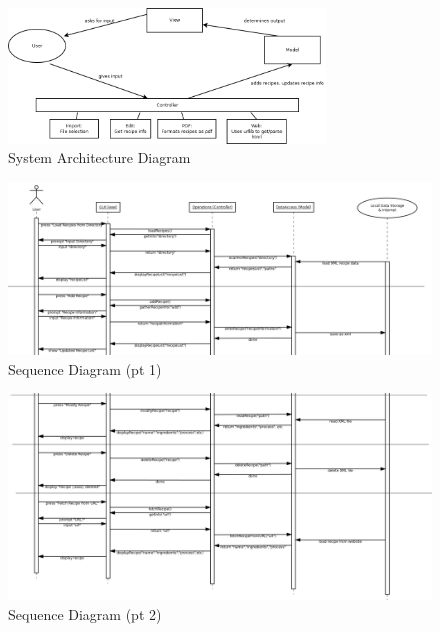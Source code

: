 \documentclass[landscape]{article}
\begin{document}
\begin{figure}[H]
\begin{centering}
\includegraphics[width=0.75\textwidth]{Diagram-SystemArchitecture.png}
\caption{System Architecture Diagram}
\end{centering}
\end{figure}

\begin{figure}[H]
\begin{centering}
\includegraphics[width=\textwidth]{Diagram-SequenceA.png}
\caption{Sequence Diagram (pt 1)}
\end{centering}
\end{figure}

\begin{figure}[H]
\begin{centering}
\includegraphics[width=\textwidth]{Diagram-SequenceB.png}
\caption{Sequence Diagram (pt 2)}
\end{centering}
\end{figure}
\end{document}
